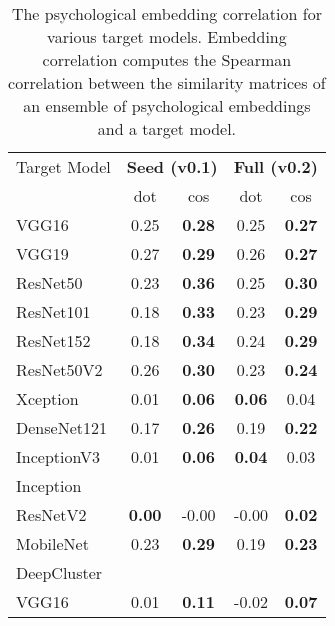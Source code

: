 \begin{table}
\begin{center}
\begin{tabular}{|l|c|c|c|c|}
\hline
Target Model & \multicolumn{2}{|c|}{\bf{Seed (v0.1)}} & \multicolumn{2}{|c|}{\bf{Full (v0.2)}} \\
  & dot & cos & dot & cos \\
\hline\hline
VGG16 & 0.25 & \bf{0.28} & 0.25 & \bf{0.27} \\
VGG19 & 0.27 & \bf{0.29} & 0.26 & \bf{0.27} \\
ResNet50 & 0.23 & \bf{0.36} & 0.25 & \bf{0.30} \\
ResNet101 & 0.18 & \bf{0.33} & 0.23 & \bf{0.29} \\
ResNet152 & 0.18 & \bf{0.34} & 0.24 & \bf{0.29} \\
ResNet50V2 & 0.26 & \bf{0.30} & 0.23 & \bf{0.24} \\
Xception & 0.01 & \bf{0.06} & \bf{0.06} & 0.04 \\
DenseNet121 & 0.17 & \bf{0.26} & 0.19 & \bf{0.22} \\
InceptionV3 & 0.01 & \bf{0.06} & \bf{0.04} & 0.03 \\
Inception & & & & \\
\hspace{3mm}ResNetV2 & \bf{0.00} & -0.00 & -0.00 & \bf{0.02} \\
MobileNet & 0.23 & \bf{0.29} & 0.19 & \bf{0.23} \\
DeepCluster & & & & \\
\hspace{3mm}VGG16 & 0.01 & \bf{0.11} & -0.02 & \bf{0.07} \\
\hline
\end{tabular}
\end{center}
\caption{The psychological embedding correlation for various target models. Embedding correlation computes the Spearman correlation between the similarity matrices of an ensemble of psychological embeddings and a target model.}
\end{table}
